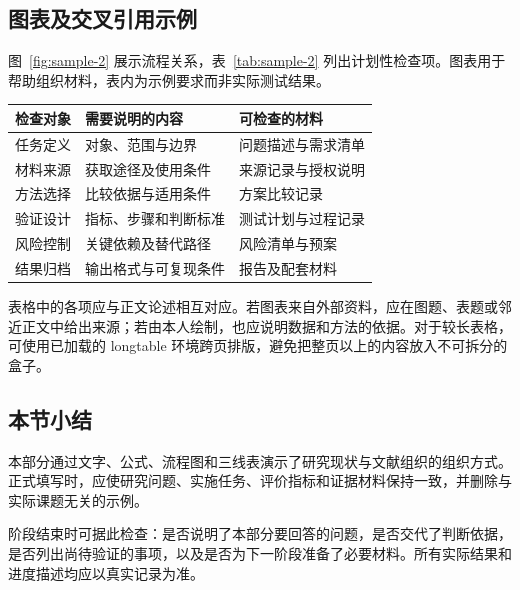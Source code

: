 \subsection{图表及交叉引用示例}
图~\ref{fig:sample-2} 展示流程关系，表~\ref{tab:sample-2} 列出计划性检查项。图表用于帮助组织材料，表内为示例要求而非实际测试结果。
\begin{center}
\begin{minipage}{\linewidth}\centering
{}
\label{fig:sample-2}
\end{minipage}\end{center}
\begin{center}\begin{minipage}{\linewidth}\centering
{}\label{tab:sample-2}
\begin{tabularx}{\linewidth}{p{23mm}XX}
\toprule
检查对象 & 需要说明的内容 & 可检查的材料\\
\midrule
任务定义 & 对象、范围与边界 & 问题描述与需求清单\\
材料来源 & 获取途径及使用条件 & 来源记录与授权说明\\
方法选择 & 比较依据与适用条件 & 方案比较记录\\
验证设计 & 指标、步骤和判断标准 & 测试计划与过程记录\\
风险控制 & 关键依赖及替代路径 & 风险清单与预案\\
结果归档 & 输出格式与可复现条件 & 报告及配套材料\\
\bottomrule
\end{tabularx}
\end{minipage}\end{center}
表格中的各项应与正文论述相互对应。若图表来自外部资料，应在图题、表题或邻近正文中给出来源；若由本人绘制，也应说明数据和方法的依据。对于较长表格，可使用已加载的 longtable 环境跨页排版，避免把整页以上的内容放入不可拆分的盒子。

\subsection{本节小结}
本部分通过文字、公式、流程图和三线表演示了研究现状与文献组织的组织方式。正式填写时，应使研究问题、实施任务、评价指标和证据材料保持一致，并删除与实际课题无关的示例。

阶段结束时可据此检查：是否说明了本部分要回答的问题，是否交代了判断依据，是否列出尚待验证的事项，以及是否为下一阶段准备了必要材料。所有实际结果和进度描述均应以真实记录为准。
